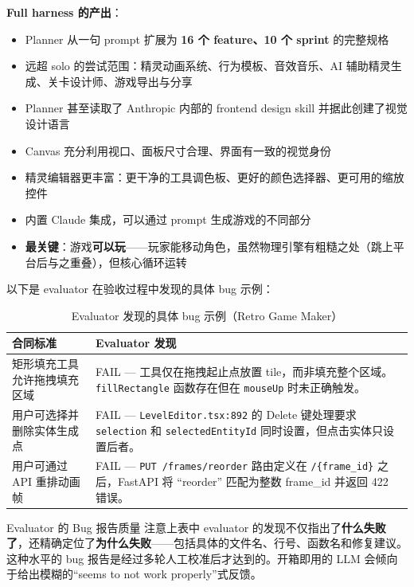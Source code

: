 \documentclass[a4paper]{article}
\begin{document}
\textbf{Full harness 的产出}：
\begin{itemize}[leftmargin=1.5em]
    \item Planner 从一句 prompt 扩展为 \textbf{16 个 feature、10 个 sprint} 的完整规格
    \item 远超 solo 的尝试范围：精灵动画系统、行为模板、音效音乐、AI 辅助精灵生成、关卡设计师、游戏导出与分享
    \item Planner 甚至读取了 Anthropic 内部的 frontend design skill 并据此创建了视觉设计语言
    \item Canvas 充分利用视口、面板尺寸合理、界面有一致的视觉身份
    \item 精灵编辑器更丰富：更干净的工具调色板、更好的颜色选择器、更可用的缩放控件
    \item 内置 Claude 集成，可以通过 prompt 生成游戏的不同部分
    \item \textbf{最关键}：游戏\textbf{可以玩}——玩家能移动角色，虽然物理引擎有粗糙之处（跳上平台后与之重叠），但核心循环运转
\end{itemize}

以下是 evaluator 在验收过程中发现的具体 bug 示例：

\begin{table}[H]
\centering
\small
\renewcommand{\arraystretch}{1.3}
\begin{tabular}{p{4cm}p{9cm}}
\toprule
\textbf{合同标准} & \textbf{Evaluator 发现} \\
\midrule
矩形填充工具允许拖拽填充区域 & FAIL --- 工具仅在拖拽起止点放置 tile，而非填充整个区域。\texttt{fillRectangle} 函数存在但在 \texttt{mouseUp} 时未正确触发。 \\
\midrule
用户可选择并删除实体生成点 & FAIL --- \texttt{LevelEditor.tsx:892} 的 Delete 键处理要求 \texttt{selection} 和 \texttt{selectedEntityId} 同时设置，但点击实体只设置后者。 \\
\midrule
用户可通过 API 重排动画帧 & FAIL --- \texttt{PUT /frames/reorder} 路由定义在 \texttt{/\{frame\_id\}} 之后，FastAPI 将 ``reorder'' 匹配为整数 frame\_id 并返回 422 错误。 \\
\bottomrule
\end{tabular}
\caption{Evaluator 发现的具体 bug 示例（Retro Game Maker）}
\end{table}

\begin{knowledgebox}{Evaluator 的 Bug 报告质量}
注意上表中 evaluator 的发现不仅指出了\textbf{什么失败了}，还精确定位了\textbf{为什么失败}——包括具体的文件名、行号、函数名和修复建议。这种水平的 bug 报告是经过多轮人工校准后才达到的。开箱即用的 LLM 会倾向于给出模糊的``seems to not work properly''式反馈。
\end{knowledgebox}
\end{document}
